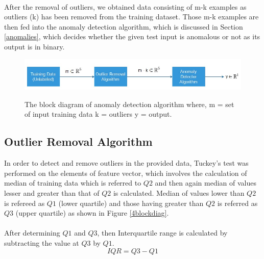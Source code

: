 \documentclass[12pt]{article}
\begin{document}
\paragraph{} After the removal of outliers, we obtained data consisting of m-k examples as outliers (k) has been removed from the training dataset. Those m-k examples are then fed into the anomaly detection algorithm, which is discussed in Section \ref{anomalies}, which decides whether the given test input is anomalous or not as its output is in binary.

\begin{figure}[H]
	\centering
	{\includegraphics[scale=0.60]{block_anomaly.jpg}\label{5blockdiag}
	}
	\caption[The Block Diagram of the designed application]{The block diagram of anomaly detection algorithm where, \newline
	m = set of input training data \newline
    k = outliers \newline
    y = output.}
	\label{5blockdiag}
	\hspace{0.7cm}%
\end{figure}



\subsection{Outlier Removal Algorithm}
\label{Outliers}
In order to detect and remove outliers in the provided data, Tuckey's test was performed on the elements of feature vector, which involves the calculation of median of training data which is referred to $Q2$ and then again median of values lesser and greater than that of $Q2$ is calculated. Median of values lower than $Q2$ is refereed as $Q1$ (lower quartile) and those having greater than $Q2$ is referred as $Q3$ (upper quartile) as shown in Figure \ref{4blockdiag}.
\paragraph{} After determining $Q1$ and $Q3$, then Interquartile range is calculated by subtracting the value at $Q3$ by $Q1$.
\begin{equation}
IQR = Q3-Q1
\end{equation}
\end{document}
